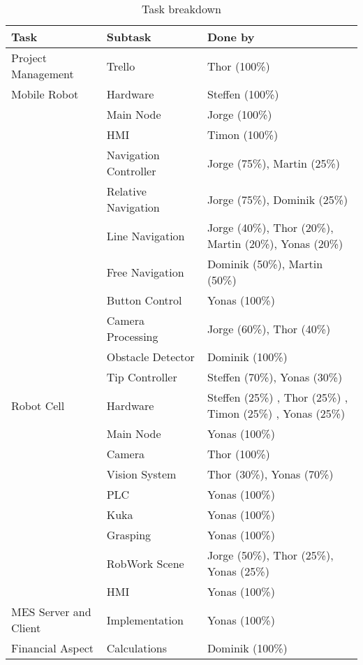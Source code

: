 \begin{table}[!h]
\centering
\begin{tabular}{lll}
\textbf{Task} & \textbf{Subtask} & \textbf{Done by} \\ \hline
Project Management     & Trello & Thor (100\%)        \\ \hline
Mobile Robot & Hardware & Steffen (100\%)       \\ \hline
 & Main Node & Jorge (100\%)       \\ \hline
 & HMI & Timon (100\%)        \\ \hline 
 & Navigation Controller & Jorge (75\%), Martin (25\%)       \\ \hline 
 & Relative Navigation & Jorge (75\%), Dominik (25\%)      \\ \hline
 & Line Navigation & Jorge (40\%), Thor (20\%), Martin (20\%), Yonas (20\%)   \\ \hline
 & Free Navigation & Dominik (50\%), Martin (50\%)     \\ \hline
 & Button Control & Yonas (100\%)       \\ \hline
 & Camera Processing & Jorge (60\%), Thor (40\%)      \\ \hline
 & Obstacle Detector & Dominik (100\%)       \\ \hline 
 & Tip Controller & Steffen (70\%), Yonas (30\%)        \\ \hline 
Robot Cell & Hardware & Steffen (25\%) , Thor (25\%) , Timon (25\%) , Yonas (25\%)  \\ \hline
 & Main Node & Yonas (100\%)        \\ \hline
 & Camera & Thor (100\%)        \\ \hline
 & Vision System & Thor (30\%), Yonas (70\%)       \\ \hline
 & PLC & Yonas (100\%)        \\ \hline
 & Kuka & Yonas (100\%)      \\ \hline
 & Grasping & Yonas (100\%)        \\ \hline
 & RobWork Scene & Jorge (50\%), Thor (25\%), Yonas (25\%)         \\ \hline
 & HMI & Yonas (100\%)         \\ \hline
MES Server and Client & Implementation & Yonas (100\%)        \\ \hline
Financial Aspect & Calculations & Dominik (100\%)        \\ \hline
\end{tabular}
\caption{Task breakdown}
\label{tab:taks_breakdown}
\end{table}